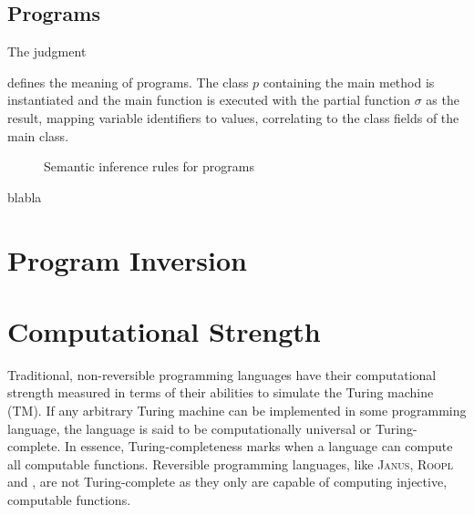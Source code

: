 \subsection{Programs}
\label{subsec:semantics-programs}
The judgment
\begin{prooftree}
\end{prooftree}
defines the meaning of programs. The class $p$ containing the main method is instantiated and the main function is executed with the partial function $\sigma$ as the result, mapping variable identifiers to values, correlating to the class fields of the main class.

\begin{figure}[ht]
    \begin{center}
        
        \DP
        \DP
        \DP
        \DP
        \DP
    \end{center}
    \caption{Semantic inference rules for programs}
    \label{fig:semantics-programs}
\end{figure}
blabla


\section{Program Inversion}
\label{sec:program-inversion}

\section{Computational Strength}
\label{sec:computational-strength}
Traditional, non-reversible programming languages have their computational strength measured in terms of their abilities to simulate the Turing machine (TM). If any arbitrary Turing machine can be implemented in some programming language, the language is said to be computationally universal or Turing-complete. In essence, Turing-completeness marks when a language can compute all computable functions. Reversible programming languages, like \textsc{Janus}, \textsc{Roopl} and \rooplpp, are not Turing-complete as they only are capable of computing injective, computable functions.

